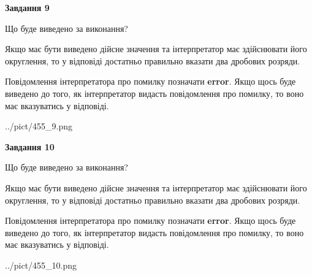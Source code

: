 \documentclass[12pt, ukrainian]{article}
\begin{document}
{\begin {Large}
{\begin {center}\textbf{Завдання 9}\end {center}}\par
Що буде виведено за виконання? \par

Якщо має бути виведено дійсне значення та інтерпретатор має здійснювати його округлення, 
то у відповіді достатньо правильно вказати два дробових розряди.

Повідомлення інтерпретатора про помилку позначати \textbf{error}.
Якщо щось буде виведено до того, як інтерпретатор видасть повідомлення про помилку, 
то воно має вказуватись у відповіді. \par

\begin{center}
	{../pict/455_9.png}
\end{center}
\newpage

{\begin {center}\textbf{Завдання 10}\end {center}}\par
Що буде виведено за виконання? \par

Якщо має бути виведено дійсне значення та інтерпретатор має здійснювати його округлення, 
то у відповіді достатньо правильно вказати два дробових розряди.

Повідомлення інтерпретатора про помилку позначати \textbf{error}.
Якщо щось буде виведено до того, як інтерпретатор видасть повідомлення про помилку, 
то воно має вказуватись у відповіді. \par

\begin{center}
	{../pict/455_10.png}
\end{center}
\newpage

\end {Large}}
\end{document}
